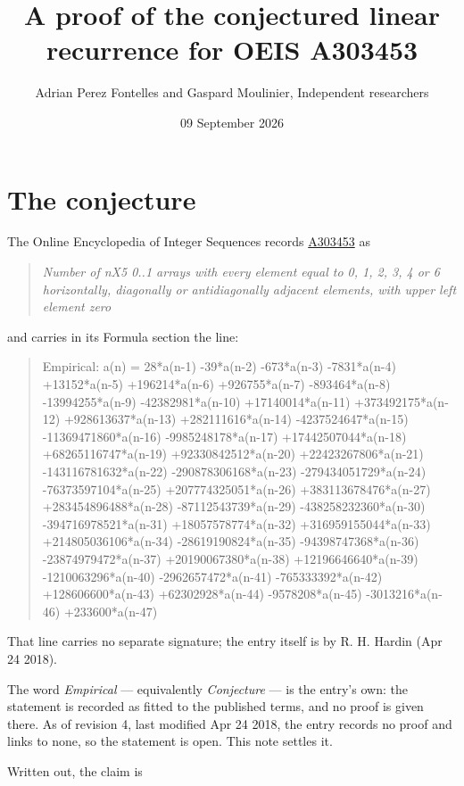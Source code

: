 \documentclass[11pt]{article}
\title{A proof of the conjectured linear recurrence for OEIS A303453}
\author{Adrian Perez Fontelles and Gaspard Moulinier, Independent researchers}
\date{09 September 2026}
\theoremstyle{definition}
\begin{document}
\maketitle
\section{The conjecture}

The Online Encyclopedia of Integer Sequences records \href{https://oeis.org/A303453}{A303453} as

\begin{quote}\itshape Number of nX5 0..1 arrays with every element equal to 0, 1, 2, 3, 4 or 6 horizontally, diagonally or antidiagonally adjacent elements, with upper left element zero\end{quote}

and carries in its Formula section the line:

\begin{quote}\ttfamily Empirical: a(n) = 28*a(n-1) -39*a(n-2) -673*a(n-3) -7831*a(n-4) +13152*a(n-5) +196214*a(n-6) +926755*a(n-7) -893464*a(n-8) -13994255*a(n-9) -42382981*a(n-10) +17140014*a(n-11) +373492175*a(n-12) +928613637*a(n-13) +282111616*a(n-14) -4237524647*a(n-15) -11369471860*a(n-16) -9985248178*a(n-17) +17442507044*a(n-18) +68265116747*a(n-19) +92330842512*a(n-20) +22423267806*a(n-21) -143116781632*a(n-22) -290878306168*a(n-23) -279434051729*a(n-24) -76373597104*a(n-25) +207774325051*a(n-26) +383113678476*a(n-27) +283454896488*a(n-28) -87112543739*a(n-29) -438258232360*a(n-30) -394716978521*a(n-31) +18057578774*a(n-32) +316959155044*a(n-33) +214805036106*a(n-34) -28619190824*a(n-35) -94398747368*a(n-36) -23874979472*a(n-37) +20190067380*a(n-38) +12196646640*a(n-39) -1210063296*a(n-40) -2962657472*a(n-41) -765333392*a(n-42) +128606600*a(n-43) +62302928*a(n-44) -9578208*a(n-45) -3013216*a(n-46) +233600*a(n-47)\end{quote}

That line carries no separate signature; the entry itself is by R. H. Hardin (Apr 24 2018).

The word {\itshape Empirical} --- equivalently {\itshape Conjecture} --- is the entry's own: the statement is recorded as fitted to the published terms, and no proof is given there. As of revision 4, last modified Apr 24 2018, the entry records no proof and links to none, so the statement is open. This note settles it.

Written out, the claim is
\end{document}
